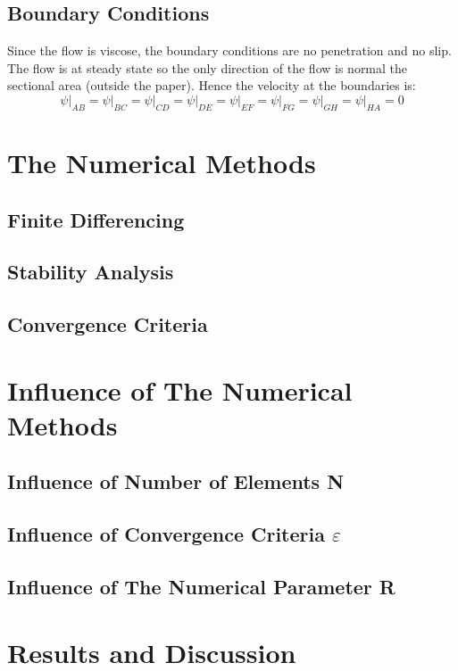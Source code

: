 \documentclass[11pt, a4paper]{article}
\begin{document}
\subsection{Boundary Conditions}
Since the flow is viscose, the boundary conditions are no penetration and no slip. The flow is at steady state so the only direction of the flow is normal the sectional area (outside the paper). Hence the velocity at the boundaries is:
\begin{equation}
    \left.\psi\right|_{AB}=\left.\psi\right|_{BC}=\left.\psi\right|_{CD}=\left.\psi\right|_{DE}=\left.\psi\right|_{EF}=\left.\psi\right|_{FG}=\left.\psi\right|_{GH}=\left.\psi\right|_{HA}=0
\end{equation}


\section{The Numerical Methods}
\subsection{Finite Differencing}
\subsection{Stability Analysis}
\subsection{Convergence Criteria}

\section{Influence of The Numerical Methods}
\subsection{Influence of Number of Elements N}
\subsection{Influence of Convergence Criteria $\varepsilon$}
\subsection{Influence of The Numerical Parameter R}

\section{Results and Discussion}
\label{sec: results and discussion}
\end{document}
